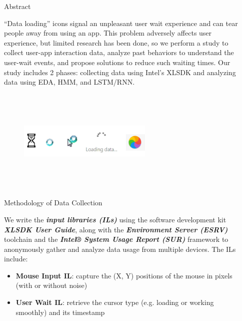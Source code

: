 \documentclass[final]{beamer}
\newlength{\sepwidth}
\newlength{\colwidth}
\newcommand{\separatorcolumn}{\begin{column}{\sepwidth}\end{column}}
\begin{document}
\begin{frame}[t]
\begin{columns}[t]
\separatorcolumn

\begin{column}{\colwidth}

  \begin{block}{\LARGE{Abstract}}

    \large{
    “Data loading” icons signal an unpleasant user wait experience and can tear people away from using an app. 
    This problem adversely affects user experience, but limited research has been done, 
    so we perform a study to collect user-app interaction data, analyze past behaviors to understand the user-wait events, 
    and propose solutions to reduce such waiting times. 
    Our study includes 2 phases: collecting data using Intel’s XLSDK and analyzing data using EDA, HMM, and LSTM/RNN.}

    \begin{figure}\includegraphics[width=0.6\textwidth, height=5cm]{user_wait.png}\end{figure}

  \end{block}

    \begin{alertblock}{\LARGE{Methodology of Data Collection}}

      \large{We write the \textbf{\textit{input libraries (ILs)}} using the  software development kit \textbf{\textit{XLSDK User Guide}}, along with the \textbf{\textit{Environment Server (ESRV)}}  toolchain  and the \textit{ \textbf{Intel® System Usage Report  (SUR)}} framework to anonymously gather and analyze data usage from multiple devices. The ILs include: 

    \begin{itemize}
      \item \textbf{Mouse Input IL}: capture the (X, Y) positions of the mouse in pixels (with or without noise)

      \item \textbf{User Wait IL}: retrieve the cursor type (e.g. loading or working smoothly) and its timestamp 


\end{itemize}}
\end{alertblock}
\end{column}
\end{columns}
\end{frame}
\end{document}
